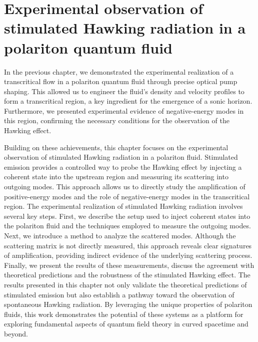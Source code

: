 \graphicspath{{./}{./fig/}{./chap_stimulated_hawking/fig/}}

\chapter{Experimental observation of stimulated Hawking radiation in a polariton quantum fluid}
\label{chap:stimulated_hawking}



In the previous chapter, we demonstrated the experimental realization of a transcritical flow in a polariton quantum fluid through precise optical pump shaping. This allowed us to engineer the fluid's density and velocity profiles to form a transcritical region, a key ingredient for the emergence of a sonic horizon. Furthermore, we presented experimental evidence of negative-energy modes in this region, confirming the necessary conditions for the observation of the Hawking effect.

Building on these achievements, this chapter focuses on the experimental observation of stimulated Hawking radiation in a polariton fluid. Stimulated emission provides a controlled way to probe the Hawking effect by injecting a coherent state into the upstream region and measuring its scattering into outgoing modes. This approach allows us to directly study the amplification of positive-energy modes and the role of negative-energy modes in the transcritical region.
The experimental realization of stimulated Hawking radiation involves several key steps. First, we describe the setup used to inject coherent states into the polariton fluid and the techniques employed to measure the outgoing modes. 
Next, we introduce a method to analyze the scattered modes. Although the scattering matrix is not directly measured, this approach reveals clear signatures of amplification, providing indirect evidence of the underlying scattering process.
 Finally, we present the results of these measurements, discuss the agreement with theoretical predictions and the robustness of the stimulated Hawking effect.
The results presented in this chapter not only validate the theoretical predictions of stimulated emission but also establish a pathway toward the observation of spontaneous Hawking radiation. By leveraging the unique properties of polariton fluids, this work demonstrates the potential of these systems as a platform for exploring fundamental aspects of quantum field theory in curved spacetime and beyond.


